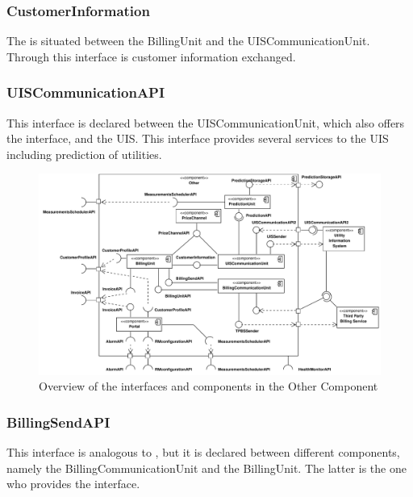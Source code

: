 \subsubsection{CustomerInformation}

\npar The  is situated between the BillingUnit
and the UISCommunicationUnit. Through this interface is customer information
exchanged.

\subsubsection{UISCommunicationAPI}

\npar This interface is declared between the UISCommunicationUnit, which
also offers the interface, and the UIS. This interface provides several services
to the UIS including prediction of utilities.

\begin{figure}[H]
	\begin{centering}
		\includegraphics[width=1.4\textwidth,angle=90]{figs/add-it10-interfaces.pdf}
		\caption{Overview of the interfaces and components in the Other Component}
		\label{fig:it10/interfaces}
	\end{centering}
\end{figure}

\subsubsection{BillingSendAPI}

\npar This interface is analogous to , but it
is declared between different components, namely the BillingCommunicationUnit
and the BillingUnit. The latter is the one who provides the interface.

